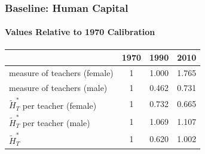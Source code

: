 \documentclass[11pt]{beamer}
\begin{document}
\begin{frame}
\frametitle{Baseline: Human Capital}
\framesubtitle{Values Relative to 1970 Calibration}
\label{base_humcap}
\begin{table}
  \centering \begin{tabular}{lccc}
\toprule
& 1970 & 1990 & 2010 \\
\midrule
measure of teachers (female) & 1 & 1.000 & 1.765\\
measure of teachers (male) & 1 & 0.462 & 0.731\\
$\widetilde{H}_T^*$ per teacher (female)   & 1 & 0.732 & 0.665 \\
$\widetilde{H}_T^*$ per teacher (male)   & 1 & 1.069 & 1.107 \\
$\widetilde{H}_T^*$ & 1  & 0.620 & 1.002 \\
\bottomrule
\end{tabular}
\end{table}
 \hyperlink{counter_humcap}{}  %
\end{frame}
\end{document}
